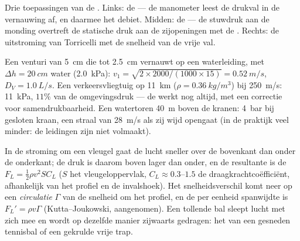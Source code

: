 \begin{omfigure}
{\small Drie toepassingen van de . Links: de
 --- de manometer leest de drukval in de vernauwing af, en
daarmee het debiet. Midden: de  --- de stuwdruk aan de monding
overtreft de statische druk aan de zijopeningen met de .
Rechts: de uitstroming van Torricelli met de snelheid van de vrije val.}
\end{omfigure}

\begin{example}[Getallen]\label{ex:b2:euler-bernoulli:numbers}
Een venturi van \qty{5}{cm} die tot \qty{2.5}{cm} vernauwt op een
waterleiding, met $\Delta h = \qty{20}{cm}$ water (\qty{2.0}{kPa}):
$v_1 = \sqrt{2 \times 2000/
(1000 \times 15)} = \qty{0.52}{m/s}$,
$D_V = \qty{1.0}{L/s}$. Een verkeersvliegtuig op \qty{11}{km}
($\rho = \qty{0.36}{kg/m^3}$) bij \qty{250}{m/s}: 
\qty{11}{kPa}, $11\%$ van de omgevingsdruk --- de  werkt nog
altijd, met een correctie voor samendrukbaarheid. Een watertoren \qty{40}{m}
boven de kranen: \qty{4}{bar} bij gesloten kraan, een straal van
\qty{28}{m/s} als zij wijd opengaat (in de praktijk veel minder: de
leidingen zijn niet volmaakt).
\end{example}

\begin{proposition}\label{prop:b2:euler-bernoulli:lift}
In de stroming om een vleugel gaat de lucht sneller over de bovenkant dan
onder de onderkant; de druk is daarom boven lager dan onder, en de
resultante is de \emph{} $F_L =
\tfrac12\rho v^2SC_L$ ($S$ het
vleugeloppervlak, $C_L \approx 0.3$--$1.5$ de draagkrachtcoëfficiënt,
afhankelijk van het profiel en de invalshoek). Het snelheidsverschil komt
neer op een \emph{circulatie} $\Gamma$ van de snelheid om het profiel, en de
 per eenheid spanwijdte is $F_L' =
\rho v\Gamma$
(Kutta--Joukowski, aangenomen). Een tollende bal sleept lucht met zich mee
en wordt op dezelfde manier zijwaarts gedragen: het \emph{} van
een gesneden tennisbal of een gekrulde vrije trap.
\end{proposition}

